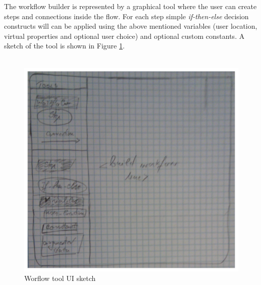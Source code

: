 The workflow builder is represented by a graphical tool where the user can create steps and connections inside the flow. For each step simple \emph{if-then-else} decision constructs will can be applied using the above mentioned variables (user location, virtual properties and optional user choice) and optional custom constants. A sketch of the tool is shown in Figure \ref{fig.design.workflow_sketch}.
\\\\
\begin{figure}[H]
	\centering
	\includegraphics[width=0.9\linewidth]{fig/workflow_sketch}
	\caption{Worflow tool UI sketch}
	\label{fig.design.workflow_sketch}
\end{figure}

